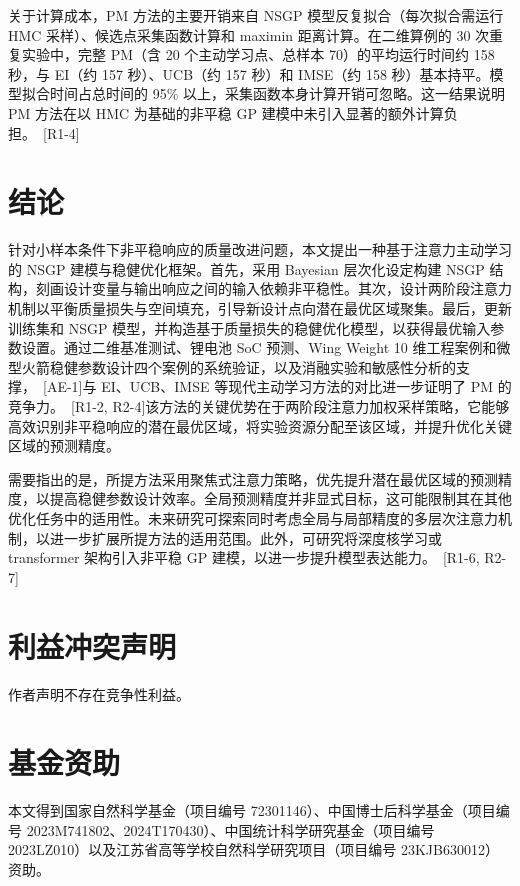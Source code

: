 \documentclass[]{interact}
\DeclareRobustCommand{\reviewadd}[2]{{\color{red}#1}\ {\color{blue}\footnotesize[#2]}}
\theoremstyle{plain}%
\theoremstyle{definition}
\theoremstyle{remark}
\begin{document}
\reviewadd{关于计算成本，PM 方法的主要开销来自 NSGP 模型反复拟合（每次拟合需运行 HMC 采样）、候选点采集函数计算和 maximin 距离计算。在二维算例的 30 次重复实验中，完整 PM（含 20 个主动学习点、总样本 70）的平均运行时间约 158 秒，与 EI（约 157 秒）、UCB（约 157 秒）和 IMSE（约 158 秒）基本持平。模型拟合时间占总时间的 95\% 以上，采集函数本身计算开销可忽略。这一结果说明 PM 方法在以 HMC 为基础的非平稳 GP 建模中未引入显著的额外计算负担。}{R1-4}

\section{结论}
针对小样本条件下非平稳响应的质量改进问题，本文提出一种基于注意力主动学习的 NSGP 建模与稳健优化框架。首先，采用 Bayesian 层次化设定构建 NSGP 结构，刻画设计变量与输出响应之间的输入依赖非平稳性。其次，设计两阶段注意力机制以平衡质量损失与空间填充，引导新设计点向潜在最优区域聚集。最后，更新训练集和 NSGP 模型，并构造基于质量损失的稳健优化模型，以获得最优输入参数设置。\reviewadd{通过二维基准测试、锂电池 SoC 预测、Wing Weight 10 维工程案例和微型火箭稳健参数设计四个案例的系统验证，以及消融实验和敏感性分析的支撑，}{AE-1}\reviewadd{与 EI、UCB、IMSE 等现代主动学习方法的对比进一步证明了 PM 的竞争力。}{R1-2, R2-4}该方法的关键优势在于两阶段注意力加权采样策略，它能够高效识别非平稳响应的潜在最优区域，将实验资源分配至该区域，并提升优化关键区域的预测精度。

需要指出的是，所提方法采用聚焦式注意力策略，优先提升潜在最优区域的预测精度，以提高稳健参数设计效率。全局预测精度并非显式目标，这可能限制其在其他优化任务中的适用性。未来研究可探索同时考虑全局与局部精度的多层次注意力机制，以进一步扩展所提方法的适用范围。\reviewadd{此外，可研究将深度核学习或 transformer 架构引入非平稳 GP 建模，以进一步提升模型表达能力。}{R1-6, R2-7}


\section*{利益冲突声明}

作者声明不存在竞争性利益。


\section*{基金资助}

本文得到国家自然科学基金（项目编号 72301146）、中国博士后科学基金（项目编号 2023M741802、2024T170430）、中国统计科学研究基金（项目编号 2023LZ010）以及江苏省高等学校自然科学研究项目（项目编号 23KJB630012）资助。
\end{document}
